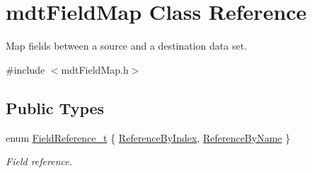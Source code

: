 \hypertarget{classmdt_field_map}{
\section{mdtFieldMap Class Reference}
\label{classmdt_field_map}
}


Map fields between a source and a destination data set.  




{\ttfamily \#include $<$mdtFieldMap.h$>$}

\subsection*{Public Types}
\begin{DoxyCompactItemize}
\item 
enum \hyperlink{classmdt_field_map_a8a8dd62273d396d926bf3df837407392}{FieldReference\_\-t} \{ \hyperlink{classmdt_field_map_a8a8dd62273d396d926bf3df837407392a97087465cf8e740359c63ded60db38e6}{ReferenceByIndex}, 
\hyperlink{classmdt_field_map_a8a8dd62273d396d926bf3df837407392a1e9f34c9b214c691edc9d0ed7f7056a1}{ReferenceByName}
 \}
\begin{DoxyCompactList}\small\item\em Field reference. \end{DoxyCompactList}\end{DoxyCompactItemize}
